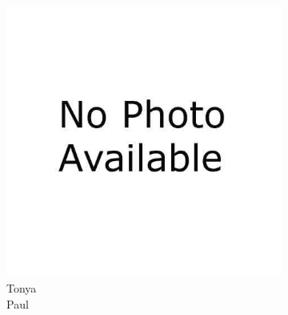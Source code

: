 \begin{figure}[H]
        \setcounter{subfigure}{0}
        \centering
        \begin{subfigure}[b]{0.1\textwidth}
                \includegraphics[width=\textwidth]{mugs/noimage}
                \caption*{Tonya \\ Paul}
        \end{subfigure}%
        ~ %
        \begin{subfigure}[b]{0.1\textwidth}

\end{subfigure}
\end{figure}
